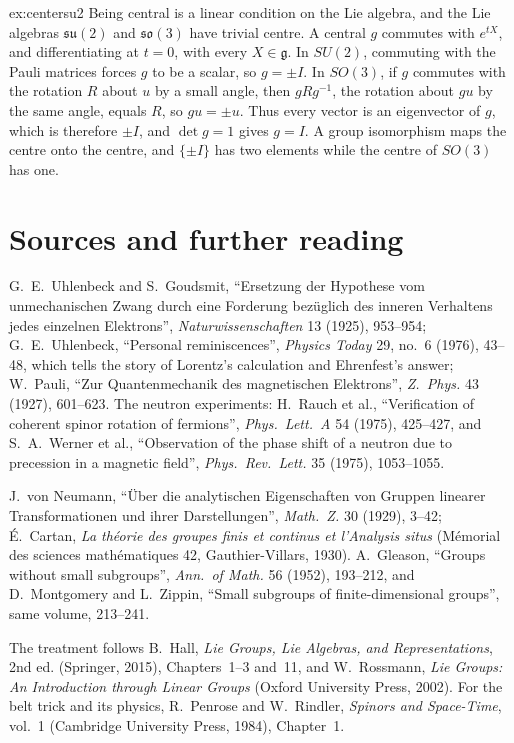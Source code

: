 \begin{solution}{ex:centersu2}
\idea Being central is a linear condition on the Lie algebra, and the Lie algebras $\mathfrak{su}(2)$ and $\mathfrak{so}(3)$ have trivial centre.
\writeup A central $g$ commutes with $e^{tX}$, and differentiating at $t=0$, with every $X\in\mathfrak g$. In $SU(2)$, commuting with the Pauli matrices forces $g$ to be a scalar, so $g=\pm I$. In $SO(3)$, if $g$ commutes with the rotation $R$
about $u$ by a small angle, then $gRg^{-1}$, the rotation about $gu$ by the same angle, equals $R$, so $gu=\pm u$. Thus every vector is an eigenvector of $g$, which is therefore $\pm I$, and $\det g=1$ gives $g=I$. A group isomorphism
maps the centre onto the centre, and $\{\pm I\}$ has two elements while the centre of $SO(3)$ has one.
\end{solution}

\section*{Sources and further reading}

G.~E.~Uhlenbeck and S.~Goudsmit, ``Ersetzung der Hypothese vom unmechanischen Zwang durch eine Forderung bez\"uglich des inneren Verhaltens jedes einzelnen Elektrons'', \emph{Naturwissenschaften}
13 (1925), 953--954; G.~E.~Uhlenbeck, ``Personal reminiscences'', \emph{Physics Today} 29, no.~6 (1976), 43--48, which tells the story of Lorentz's calculation and Ehrenfest's answer; W.~Pauli, ``Zur Quantenmechanik
des magnetischen Elektrons'', \emph{Z.\ Phys.} 43 (1927), 601--623. The neutron experiments: H.~Rauch et al., ``Verification of coherent spinor rotation of fermions'', \emph{Phys.\ Lett.\ A} 54 (1975), 425--427, and
S.~A.~Werner et al., ``Observation of the phase shift of a neutron due to precession in a magnetic field'', \emph{Phys.\ Rev.\ Lett.} 35 (1975), 1053--1055.

J.~von Neumann, ``\"Uber die analytischen Eigenschaften von Gruppen linearer Transformationen und ihrer Darstellungen'', \emph{Math.\ Z.} 30 (1929), 3--42; \'E.~Cartan, \emph{La th\'eorie des groupes finis et
continus et l'Analysis situs} (M\'emorial des sciences math\'ematiques 42, Gauthier-Villars, 1930). A.~Gleason, ``Groups without small subgroups'', \emph{Ann.\ of Math.} 56 (1952), 193--212, and D.~Montgomery and
L.~Zippin, ``Small subgroups of finite-dimensional groups'', same volume, 213--241.

The treatment follows B.~Hall, \emph{Lie Groups, Lie Algebras, and Representations}, 2nd ed. (Springer, 2015), Chapters~1--3 and~11, and W.~Rossmann, \emph{Lie Groups: An Introduction through Linear Groups}
(Oxford University Press, 2002). For the belt trick and its physics, R.~Penrose and W.~Rindler, \emph{Spinors and Space-Time}, vol.~1 (Cambridge University Press, 1984), Chapter~1.
